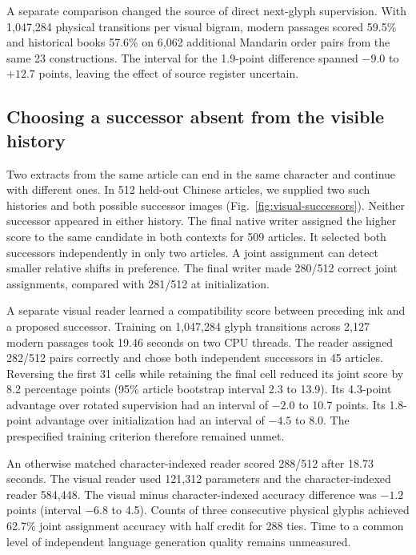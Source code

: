 \documentclass[12pt,a4paper]{article}
\providecommand{\DIFadd}[1]{{\protect\color{blue} \sf #1}} %
\begin{document}
\DIFadd{A separate comparison changed the source of direct next-glyph supervision.
With 1,047,284 physical transitions per visual bigram, modern passages scored
59.5\% and historical books 57.6\% on 6,062 additional Mandarin order pairs
from the same 23 constructions. The interval for the 1.9-point difference
spanned $-9.0$ to $+12.7$ points, leaving the effect of source register uncertain.
}

\subsection*{\DIFadd{Choosing a successor absent from the visible history}}
\DIFadd{Two extracts from the same article can end in the same character and continue
with different ones. In 512 held-out Chinese articles, we supplied two such
histories and both possible successor images (Fig.~\ref{fig:visual-successors}).
Neither successor appeared in either history. The final native writer assigned
the higher score to the same candidate in both contexts for 509 articles. It
selected both successors independently in only two articles. A joint assignment
can detect smaller relative shifts in preference. The final writer made 280/512
correct joint assignments, compared with 281/512 at initialization.
}

\DIFadd{A separate visual reader learned a compatibility score between preceding ink
and a proposed successor. Training on 1,047,284 glyph transitions across 2,127
modern passages took 19.46 seconds on two CPU threads. The reader assigned
282/512 pairs correctly and chose both independent successors in 45 articles.
Reversing the first 31 cells while retaining the final cell reduced its joint
score by 8.2 percentage points (95\% article bootstrap interval 2.3 to 13.9).
Its 4.3-point advantage over rotated supervision had an interval of $-2.0$ to
10.7 points. Its 1.8-point advantage over initialization had an interval of
$-4.5$ to 8.0. The prespecified training criterion therefore remained unmet.
}

\DIFadd{An otherwise matched character-indexed reader scored 288/512 after 18.73
seconds. The visual reader used 121,312 parameters and the character-indexed
reader 584,448. The visual minus character-indexed accuracy difference was
$-1.2$ points (interval $-6.8$ to 4.5). Counts of three consecutive
physical glyphs achieved 62.7\% joint assignment accuracy with half
credit for 288 ties. Time to a common level of independent language
generation quality remains unmeasured.
}
\end{document}
